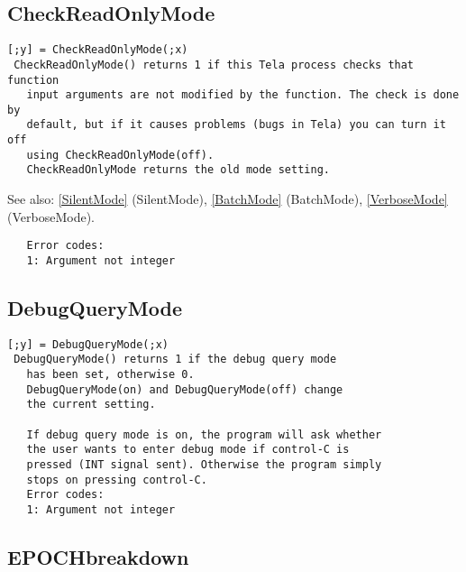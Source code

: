 \documentclass[a4paper]{article}
\begin{document}
\subsection{CheckReadOnlyMode\label{CheckReadOnlyMode}}

\begin{tscreen}
\begin{verbatim}
[;y] = CheckReadOnlyMode(;x)
 CheckReadOnlyMode() returns 1 if this Tela process checks that function
   input arguments are not modified by the function. The check is done by
   default, but if it causes problems (bugs in Tela) you can turn it off
   using CheckReadOnlyMode(off).
   CheckReadOnlyMode returns the old mode setting.
\end{verbatim}

See also: \ref{SilentMode} {(SilentMode)}, \ref{BatchMode} {(BatchMode)}, \ref{VerboseMode} {(VerboseMode)}.
\begin{verbatim}
   Error codes:
   1: Argument not integer 
\end{verbatim}
\end{tscreen}





\subsection{DebugQueryMode\label{DebugQueryMode}}

\begin{tscreen}
\begin{verbatim}
[;y] = DebugQueryMode(;x)
 DebugQueryMode() returns 1 if the debug query mode
   has been set, otherwise 0.
   DebugQueryMode(on) and DebugQueryMode(off) change
   the current setting.

   If debug query mode is on, the program will ask whether
   the user wants to enter debug mode if control-C is
   pressed (INT signal sent). Otherwise the program simply
   stops on pressing control-C.
   Error codes:
   1: Argument not integer 
\end{verbatim}
\end{tscreen}





\subsection{EPOCHbreakdown\label{EPOCHbreakdown}}
\end{document}
